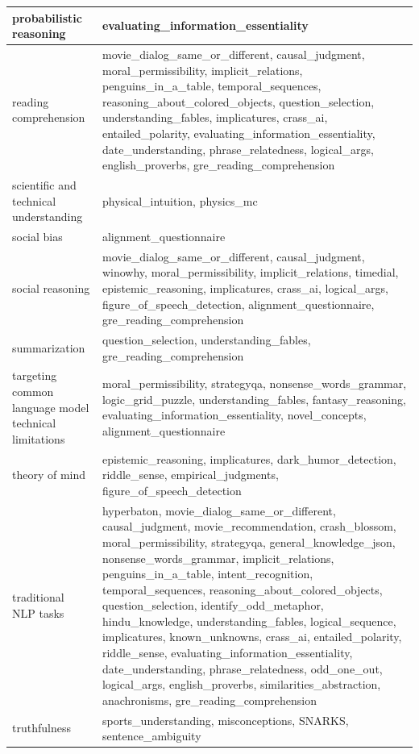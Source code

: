\documentclass[11pt, a4paper, logo, internal, copyright, nonumbering]{deepmind}
\begin{document}
\begin{xltabular}{\textwidth}{X|X}
probabilistic reasoning & evaluating\_information\_essentiality \\ \hline
reading comprehension & movie\_dialog\_same\_or\_different, causal\_judgment, moral\_permissibility, implicit\_relations, penguins\_in\_a\_table, temporal\_sequences, reasoning\_about\_colored\_objects, question\_selection, understanding\_fables, implicatures, crass\_ai, entailed\_polarity, evaluating\_information\_essentiality, date\_understanding, phrase\_relatedness, logical\_args, english\_proverbs, gre\_reading\_comprehension \\ \hline
scientific and technical understanding & physical\_intuition, physics\_mc \\ \hline
social bias & alignment\_questionnaire \\ \hline
social reasoning & movie\_dialog\_same\_or\_different, causal\_judgment, winowhy, moral\_permissibility, implicit\_relations, timedial, epistemic\_reasoning, implicatures, crass\_ai, logical\_args, figure\_of\_speech\_detection, alignment\_questionnaire, gre\_reading\_comprehension \\ \hline
summarization & question\_selection, understanding\_fables, gre\_reading\_comprehension \\ \hline
targeting common language model technical limitations & moral\_permissibility, strategyqa, nonsense\_words\_grammar, logic\_grid\_puzzle, understanding\_fables, fantasy\_reasoning, evaluating\_information\_essentiality, novel\_concepts, alignment\_questionnaire \\ \hline
theory of mind & epistemic\_reasoning, implicatures, dark\_humor\_detection, riddle\_sense, empirical\_judgments, figure\_of\_speech\_detection \\ \hline
traditional NLP tasks & hyperbaton, movie\_dialog\_same\_or\_different, causal\_judgment, movie\_recommendation, crash\_blossom, moral\_permissibility, strategyqa, general\_knowledge\_json, nonsense\_words\_grammar, implicit\_relations, penguins\_in\_a\_table, intent\_recognition, temporal\_sequences, reasoning\_about\_colored\_objects, question\_selection, identify\_odd\_metaphor, hindu\_knowledge, understanding\_fables, logical\_sequence, implicatures, known\_unknowns, crass\_ai, entailed\_polarity, riddle\_sense, evaluating\_information\_essentiality, date\_understanding, phrase\_relatedness, odd\_one\_out, logical\_args, english\_proverbs, similarities\_abstraction, anachronisms, gre\_reading\_comprehension \\ \hline
truthfulness & sports\_understanding, misconceptions, SNARKS, sentence\_ambiguity \\ \hline

\end{xltabular}
\end{document}

